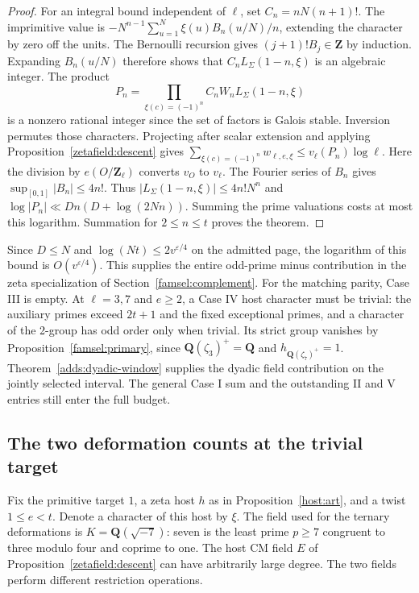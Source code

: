\begin{proof}
For an integral bound independent of \(\ell\), set \(C_n=nN(n+1)!\).
The imprimitive value is \(-N^{n-1}\sum_{u=1}^{N}\xi(u)B_n(u/N)/n\),
extending the character by zero off the units. The Bernoulli recursion
gives \((j+1)!B_j\in\mathbf Z\) by induction. Expanding \(B_n(u/N)\)
therefore shows that \(C_nL_\Sigma(1-n,\xi)\) is an algebraic integer.
The product
\[
  P_n=\prod_{\xi(c)=(-1)^n} C_nW_nL_\Sigma(1-n,\xi)
\]
is a nonzero rational integer since the set of factors is Galois stable.
Inversion permutes those characters. Projecting after scalar extension
and applying Proposition~\ref{zetafield:descent} gives
\(\sum_{\xi(c)=(-1)^n}w_{\ell,e,\xi}\le v_\ell(P_n)\log\ell\).
Here the division by \(e(O/\mathbf Z_\ell)\) converts \(v_O\) to \(v_\ell\).
The Fourier series of \(B_n\) gives \(\sup_{[0,1]}|B_n|\le4n!\).
Thus \(|L_\Sigma(1-n,\xi)|\le 4n!N^n\) and
\(\log |P_n|\ll Dn(D+\log(2Nn))\).
Summing the prime valuations costs at most this logarithm.
Summation for \(2\le n\le t\) proves the theorem.
\end{proof}

Since \(D\le N\) and \(\log(Nt)\le 2v^{\varepsilon/4}\) on the admitted
page, the logarithm of this bound is \(O(v^{\varepsilon/4})\). This
supplies the entire odd-prime minus contribution in the zeta specialization
of Section~\ref{famsel:complement}. For the matching parity, Case III is
empty. At \(\ell=3,7\) and \(e\ge2\), a Case IV host character must
be trivial: the auxiliary primes exceed \(2t+1\) and the fixed exceptional
primes, and a character of the 2-group has odd order only when trivial.
Its strict group vanishes by Proposition~\ref{famsel:primary}, since
\(\mathbf Q(\zeta_3)^+=\mathbf Q\) and \(h_{\mathbf Q(\zeta_7)^+}=1\).
Theorem~\ref{adds:dyadic-window} supplies the dyadic field contribution
on the jointly selected interval. The general Case I sum and the
outstanding II and V entries still enter the full budget.

\subsection{The two deformation counts at the trivial target}\label{zetaring:section}

Fix the primitive target \(1\), a zeta host \(h\) as in
Proposition~\ref{host:art}, and a twist \(1\le e<t\). Denote a
character of this host by \(\xi\). The field used for the ternary
deformations is \(K=\mathbf Q(\sqrt{-7})\): seven is the least
prime \(p\ge7\) congruent to three modulo four and coprime to one.
The host CM field \(E\) of Proposition~\ref{zetafield:descent} can
have arbitrarily large degree. The two fields perform different
restriction operations.

